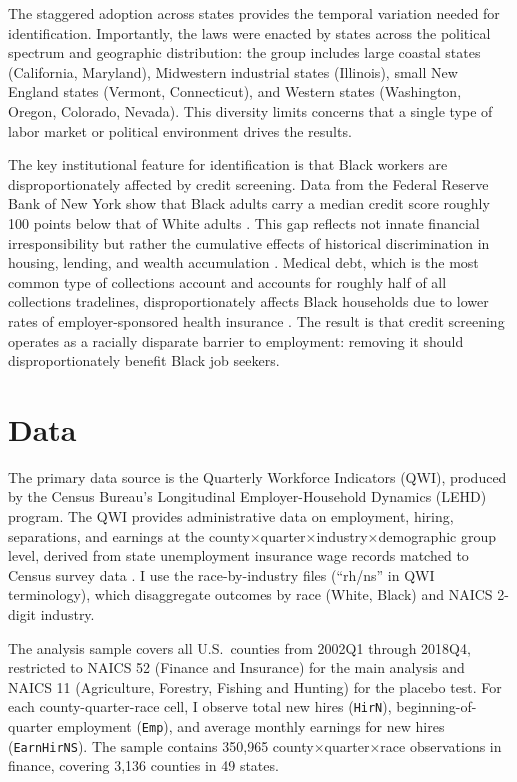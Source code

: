 \documentclass[12pt]{article}
\begin{document}
The staggered adoption across states provides the temporal variation needed for identification. Importantly, the laws were enacted by states across the political spectrum and geographic distribution: the group includes large coastal states (California, Maryland), Midwestern industrial states (Illinois), small New England states (Vermont, Connecticut), and Western states (Washington, Oregon, Colorado, Nevada). This diversity limits concerns that a single type of labor market or political environment drives the results.

The key institutional feature for identification is that Black workers are disproportionately affected by credit screening. Data from the Federal Reserve Bank of New York show that Black adults carry a median credit score roughly 100 points below that of White adults \citep{brevoort2015credit}. This gap reflects not innate financial irresponsibility but rather the cumulative effects of historical discrimination in housing, lending, and wealth accumulation \citep{darity2017stratification,baradaran2017color}. Medical debt, which is the most common type of collections account and accounts for roughly half of all collections tradelines, disproportionately affects Black households due to lower rates of employer-sponsored health insurance \citep{dobkin2018economic}. The result is that credit screening operates as a racially disparate barrier to employment: removing it should disproportionately benefit Black job seekers.

\section{Data}
\label{sec:data}

The primary data source is the Quarterly Workforce Indicators (QWI), produced by the Census Bureau's Longitudinal Employer-Household Dynamics (LEHD) program. The QWI provides administrative data on employment, hiring, separations, and earnings at the county$\times$quarter$\times$industry$\times$demographic group level, derived from state unemployment insurance wage records matched to Census survey data \citep{abowd2009lehd}. I use the race-by-industry files (``rh/ns'' in QWI terminology), which disaggregate outcomes by race (White, Black) and NAICS 2-digit industry.

The analysis sample covers all U.S.\ counties from 2002Q1 through 2018Q4, restricted to NAICS 52 (Finance and Insurance) for the main analysis and NAICS 11 (Agriculture, Forestry, Fishing and Hunting) for the placebo test. For each county-quarter-race cell, I observe total new hires (\texttt{HirN}), beginning-of-quarter employment (\texttt{Emp}), and average monthly earnings for new hires (\texttt{EarnHirNS}). The sample contains 350,965 county$\times$quarter$\times$race observations in finance, covering 3,136 counties in 49 states.
\end{document}
